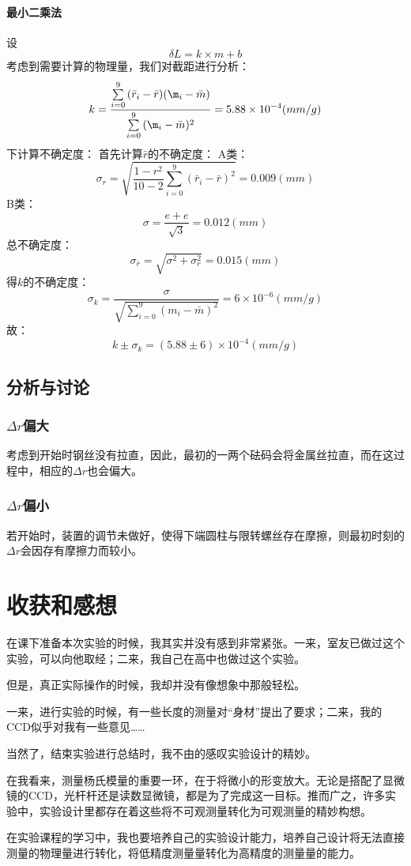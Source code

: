 \documentclass{ctexart}
\begin{document}
\paragraph{最小二乘法}
设$$\delta L=k\times m+b$$
考虑到需要计算的物理量，我们对截距进行分析：
$$k=\frac{\sum\limits_{i=0}^9{(\bar{r}_i-\bar{r})(\m_i-\bar{m})}}{\sum\limits_{i=0}^9{(\m_i-\bar{m})^2}}=5.88\times 10^{-4}(mm/g)$$
下计算不确定度：
首先计算$\bar{r}$的不确定度：
A类：$$\sigma_r =\sqrt{\frac{1-r^2}{10-2}\sum\limits_{i=0}^9{(\bar{r}_i-\bar{r})^2}}=0.009(mm)$$
B类：$$\sigma=\frac{e+e}{\sqrt{3}}=0.012(mm)$$
总不确定度：$$\sigma_{\bar{r}}=\sqrt{\sigma^2+\sigma_r^2}=0.015(mm)$$
得$k$的不确定度：
$$\sigma_k=\frac{\sigma}{\sqrt{\sum\limits_{i=0}^9{(m_i-\bar{m})^2}}}=6\times10^{-6}(mm/g)$$
故：
$$k\pm \sigma_k=(5.88\pm 6  )\times 10^{-4}(mm/g)$$
\subsection{分析与讨论}
\subsubsection{$\Delta r$偏大}考虑到开始时钢丝没有拉直，因此，最初的一两个砝码会将金属丝拉直，而在这过程中，相应的$\Delta r$也会偏大。
\subsubsection{$\Delta r$偏小}若开始时，装置的调节未做好，使得下端圆柱与限转螺丝存在摩擦，则最初时刻的$\Delta r$会因存有摩擦力而较小。
\section{收获和感想}
在课下准备本次实验的时候，我其实并没有感到非常紧张。一来，室友已做过这个实验，可以向他取经；二来，我自己在高中也做过这个实验。

但是，真正实际操作的时候，我却并没有像想象中那般轻松。

一来，进行实验的时候，有一些长度的测量对“身材”提出了要求；二来，我的CCD似乎对我有一些意见……

当然了，结束实验进行总结时，我不由的感叹实验设计的精妙。

在我看来，测量杨氏模量的重要一环，在于将微小的形变放大。无论是搭配了显微镜的CCD，光杆杆还是读数显微镜，都是为了完成这一目标。推而广之，许多实验中，实验设计里都存在着这些将不可观测量转化为可观测量的精妙构想。

在实验课程的学习中，我也要培养自己的实验设计能力，培养自己设计将无法直接测量的物理量进行转化，将低精度测量量转化为高精度的测量量的能力。
    
\end{document}
